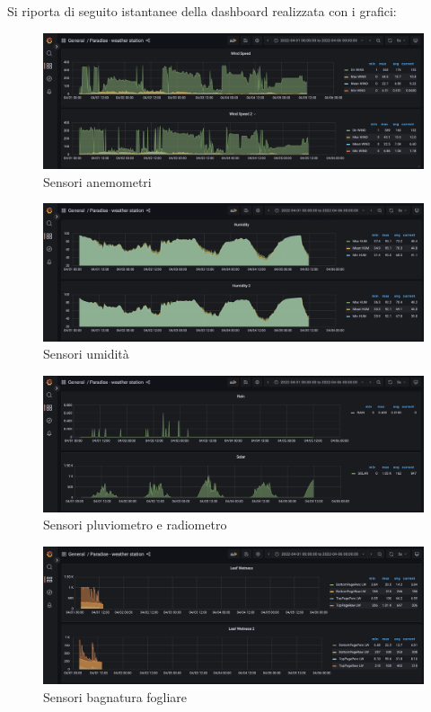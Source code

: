 \documentclass{article}
\begin{document}
Si riporta di seguito istantanee della dashboard realizzata con i grafici:
\begin{figure}[H]
\includegraphics[width=1\linewidth]{WindSpeed-Graph}
\centering
\caption*{Sensori anemometri}
\label{fig:bytepost}
\end{figure}

\begin{figure}[H]
\includegraphics[width=1\linewidth]{Humidity-Graph}
\centering
\caption*{Sensori umidità}
\label{fig:bytepost}
\end{figure}

\begin{figure}[H]
\includegraphics[width=1\linewidth]{Rain-Solar-Graph}
\centering
\caption*{Sensori pluviometro e radiometro}
\label{fig:bytepost}
\end{figure}

\begin{figure}[H]
\includegraphics[width=1\linewidth]{LeafWetness-Graph}
\centering
\caption*{Sensori bagnatura fogliare}
\label{fig:bytepost}
\end{figure}
\end{document}
